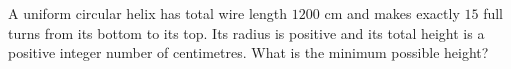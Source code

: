 A uniform circular helix has total wire length $1200$ cm and makes exactly $15$ full turns from its bottom to its top. Its radius is positive and its total height is a positive integer number of centimetres. What is the minimum possible height?
